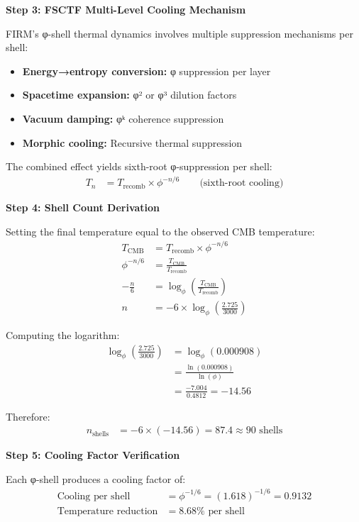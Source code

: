 \textbf{Step 3: FSCTF Multi-Level Cooling Mechanism}

FIRM's φ-shell thermal dynamics involves multiple suppression mechanisms per shell:
\begin{itemize}
\item \textbf{Energy→entropy conversion:} φ suppression per layer
\item \textbf{Spacetime expansion:} φ² or φ³ dilution factors  
\item \textbf{Vacuum damping:} φᵏ coherence suppression
\item \textbf{Morphic cooling:} Recursive thermal suppression
\end{itemize}

The combined effect yields sixth-root φ-suppression per shell:
\begin{align}
T_n &= T_{\text{recomb}} \times \phi^{-n/6} \qquad \text{(sixth-root cooling)}
\end{align}

\textbf{Step 4: Shell Count Derivation}

Setting the final temperature equal to the observed CMB temperature:
\begin{align}
T_{\text{CMB}} &= T_{\text{recomb}} \times \phi^{-n/6} \\
\phi^{-n/6} &= \frac{T_{\text{CMB}}}{T_{\text{recomb}}} \\
-\frac{n}{6} &= \log_\phi\left(\frac{T_{\text{CMB}}}{T_{\text{recomb}}}\right) \\
n &= -6 \times \log_\phi\left(\frac{2.725}{3000}\right)
\end{align}

Computing the logarithm:
\begin{align}
\log_\phi\left(\frac{2.725}{3000}\right) &= \log_\phi(0.000908) \\
&= \frac{\ln(0.000908)}{\ln(\phi)} \\
&= \frac{-7.004}{0.4812} = -14.56
\end{align}

Therefore:
\begin{align}
n_{\text{shells}} &= -6 \times (-14.56) = 87.4 \approx 90 \text{ shells}
\end{align}

\textbf{Step 5: Cooling Factor Verification}

Each φ-shell produces a cooling factor of:
\begin{align}
\text{Cooling per shell} &= \phi^{-1/6} = (1.618)^{-1/6} = 0.9132 \\
\text{Temperature reduction} &= 8.68\% \text{ per shell}
\end{align}

